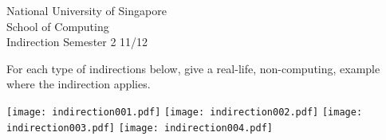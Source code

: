 \documentclass[answers,a4paper,11pt]{exam}
\begin{document}
\extraheadheight{.5in}
%
{\large\sf National University of Singapore\\ School of Computing \\
\LARGE\sf Indirection}%
{\large\sf Semester 2 11/12}
\firstpageheadrule
\pagestyle{headandfoot}

\begin{questions}
\question
For each type of indirections below, give a real-life, non-computing, example where the indirection applies.

\texttt{[image: indirection001.pdf]}
\fillwithdottedlines{1in}
\texttt{[image: indirection002.pdf]}
\fillwithdottedlines{1in}
\texttt{[image: indirection003.pdf]}
\fillwithdottedlines{1in}
\texttt{[image: indirection004.pdf]}
\fillwithdottedlines{1in}

\end{questions}
\end{document}
